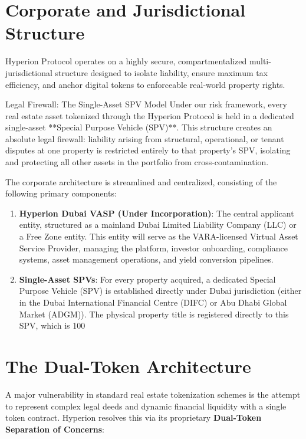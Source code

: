 \documentclass[11pt]{article}
\begin{document}
\section{Corporate and Jurisdictional Structure}
Hyperion Protocol operates on a highly secure, compartmentalized multi-jurisdictional structure designed to isolate liability, ensure maximum tax efficiency, and anchor digital tokens to enforceable real-world property rights. 

\begin{regulatorybox}{Legal Firewall: The Single-Asset SPV Model}
Under our risk framework, every real estate asset tokenized through the Hyperion Protocol is held in a dedicated single-asset **Special Purpose Vehicle (SPV)**. This structure creates an absolute legal firewall: liability arising from structural, operational, or tenant disputes at one property is restricted entirely to that property's SPV, isolating and protecting all other assets in the portfolio from cross-contamination.
\end{regulatorybox}

The corporate architecture is streamlined and centralized, consisting of the following primary components:
\begin{enumerate}
    \item \textbf{Hyperion Dubai VASP (Under Incorporation)}: The central applicant entity, structured as a mainland Dubai Limited Liability Company (LLC) or a Free Zone entity. This entity will serve as the VARA-licensed Virtual Asset Service Provider, managing the platform, investor onboarding, compliance systems, asset management operations, and yield conversion pipelines.
    \item \textbf{Single-Asset SPVs}: For every property acquired, a dedicated Special Purpose Vehicle (SPV) is established directly under Dubai jurisdiction (either in the Dubai International Financial Centre (DIFC) or Abu Dhabi Global Market (ADGM)). The physical property title is registered directly to this SPV, which is 100%
\end{enumerate}

\section{The Dual-Token Architecture}
A major vulnerability in standard real estate tokenization schemes is the attempt to represent complex legal deeds and dynamic financial liquidity with a single token contract. Hyperion resolves this via its proprietary \textbf{Dual-Token Separation of Concerns}:
\end{document}
